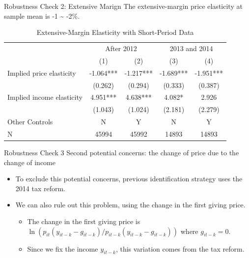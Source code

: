 \documentclass[
  ignorenonframetext,
]{beamer}
\providecommand{\tightlist}{%
  \setlength{\itemsep}{0pt}\setlength{\parskip}{0pt}}
\begin{document}
\begin{frame}{Robustness Check 2: Extensive Marign}
\protect\hypertarget{robustness-check-2-extensive-marign}{}
The extensive-margin price elasticity at sample mean is -1 \textasciitilde{} -2\%.

\begin{table}

\caption{\label{tab:kableShortElasticity2Slide2}Extensive-Margin Elasticity with Short-Period Data}
\centering
\fontsize{8}{10}\selectfont
\begin{tabular}[t]{lcccc}
\toprule
\multicolumn{1}{c}{ } & \multicolumn{2}{c}{After 2012} & \multicolumn{2}{c}{2013 and 2014} \\
\cmidrule(l{3pt}r{3pt}){2-3} \cmidrule(l{3pt}r{3pt}){4-5}
 & (1) & (2) & (3) & (4)\\
\midrule
Implied price elasticity & -1.064*** & -1.217*** & -1.689*** & -1.951***\\
 & (0.262) & (0.294) & (0.333) & (0.387)\\
Implied income elasticity & 4.951*** & 4.638*** & 4.082* & 2.926\\
 & (1.043) & (1.024) & (2.181) & (2.279)\\
Other Controls & N & Y & N & Y\\
N & 45994 & 45992 & 14893 & 14893\\
\bottomrule
\end{tabular}
\end{table}
\end{frame}

\begin{frame}{Robustness Check 3}
\protect\hypertarget{robustness-check-3}{}
Second potential concerns: the change of price due to the change of income

\begin{itemize}
\tightlist
\item
  To exclude this potential concerns, previous identification strategy uses the 2014 tax reform.
\item
  We can also rule out this problem, using the change in the first giving price.

  \begin{itemize}
  \tightlist
  \item
    The change in the first giving price is \(\ln(p_{it}(y_{it-k} - g_{it-k})/p_{it-k}(y_{it-k} - g_{it-k}))\) where \(g_{it-k} = 0\).
  \item
    Since we fix the income \(y_{it-k}\), this variation comes from the tax reform.
  \end{itemize}
\end{itemize}
\end{frame}
\end{document}
